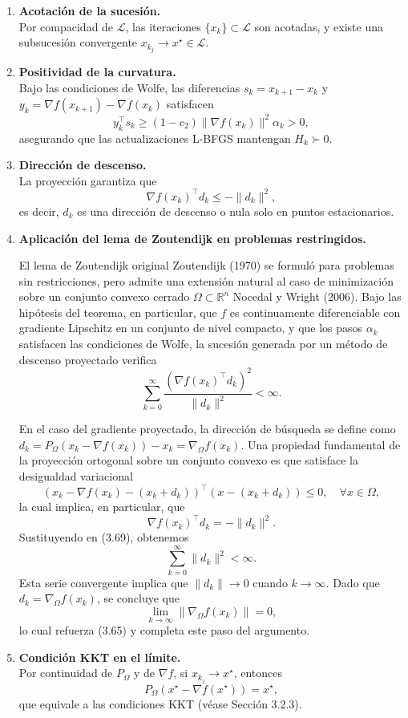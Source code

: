 \documentclass[
  spanish,
  us-letterpaper,
  DIV=11,
  numbers=noendperiod]{scrreprt}
\numberwithin{equation}{section}
\begin{document}
\begin{enumerate}
\def\labelenumi{\arabic{enumi}.}
\item
  \textbf{Acotación de la sucesión.}\\
  Por compacidad de \(\mathcal{L}\), las iteraciones
  \(\{x_k\} \subset \mathcal{L}\) son acotadas, y existe una subsucesión
  convergente \(x_{k_j} \to x^\star \in \mathcal{L}\).
\item
  \textbf{Positividad de la curvatura.}\\
  Bajo las condiciones de Wolfe, las diferencias \(s_k = x_{k+1} - x_k\)
  y \(y_k = \nabla f(x_{k+1}) - \nabla f(x_k)\) satisfacen \[
  y_k^\top s_k \ge (1 - c_2)\|\nabla f(x_k)\|^2 \alpha_k > 0, \tag{3.67}
  \] asegurando que las actualizaciones L-BFGS mantengan
  \(H_k \succ 0\).
\item
  \textbf{Dirección de descenso.}\\
  La proyección garantiza que \[
  \nabla f(x_k)^\top d_k \le -\|d_k\|^2, \tag{3.68}
  \] es decir, \(d_k\) es una dirección de descenso o nula solo en
  puntos estacionarios.
\item
  \textbf{Aplicación del lema de Zoutendijk en problemas restringidos.}

  El lema de Zoutendijk original Zoutendijk (1970) se formuló para
  problemas sin restricciones, pero admite una extensión natural al caso
  de minimización sobre un conjunto convexo cerrado
  \(\Omega \subset \mathbb{R}^n\) Nocedal y Wright (2006). Bajo las
  hipótesis del teorema, en particular, que \(f\) es continuamente
  diferenciable con gradiente Lipschitz en un conjunto de nivel
  compacto, y que los pasos \(\alpha_k\) satisfacen las condiciones de
  Wolfe, la sucesión generada por un método de descenso proyectado
  verifica \[
  \sum_{k=0}^\infty \frac{(\nabla f(x_k)^\top d_k)^2}{\|d_k\|^2} < \infty. \tag{3.69}
  \]

  En el caso del gradiente proyectado, la dirección de búsqueda se
  define como
  \(d_k = P_\Omega(x_k - \nabla f(x_k)) - x_k = \nabla_\Omega f(x_k)\).
  Una propiedad fundamental de la proyección ortogonal sobre un conjunto
  convexo es que satisface la desigualdad variacional \[
  (x_k - \nabla f(x_k) - (x_k + d_k))^\top (x - (x_k + d_k)) \le 0, \quad \forall x \in \Omega,
  \] la cual implica, en particular, que \[
  \nabla f(x_k)^\top d_k = -\|d_k\|^2. \tag{3.68}
  \] Sustituyendo en (3.69), obtenemos \[
  \sum_{k=0}^\infty \|d_k\|^2 < \infty.
  \] Esta serie convergente implica que \(\|d_k\| \to 0\) cuando
  \(k \to \infty\). Dado que \(d_k = \nabla_\Omega f(x_k)\), se concluye
  que \[
  \lim_{k \to \infty} \|\nabla_\Omega f(x_k)\| = 0,
  \] lo cual refuerza (3.65) y completa este paso del argumento.
\item
  \textbf{Condición KKT en el límite.}\\
  Por continuidad de \(P_\Omega\) y de \(\nabla f\), si
  \(x_{k_j} \to x^\star\), entonces \[
  P_\Omega(x^\star - \nabla f(x^\star)) = x^\star,
  \] que equivale a las condiciones KKT (véase Sección 3.2.3).
\end{enumerate}
\end{document}
